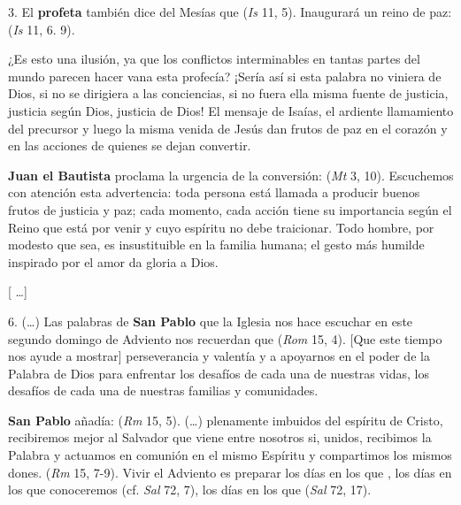 \begin{body}
	3. El \textbf{profeta} también dice del Mesías que  (\emph{Is} 11, 5). Inaugurará un reino de paz:  (\emph{Is} 11, 6. 9). 
	
	¿Es esto una ilusión, ya que los conflictos interminables en tantas partes del mundo parecen hacer vana esta profecía? ¡Sería así si esta palabra no viniera de Dios, si no se dirigiera a las conciencias, si no fuera ella misma fuente de justicia, justicia según Dios, justicia de Dios! El mensaje de Isaías, el ardiente llamamiento del precursor y luego la misma venida de Jesús dan frutos de paz en el corazón y en las acciones de quienes se dejan convertir. 
	
	\textbf{Juan el Bautista} proclama la urgencia de la conversión:  (\emph{Mt} 3, 10). Escuchemos con atención esta advertencia: toda persona está llamada a producir buenos frutos de justicia y paz; cada momento, cada acción tiene su importancia según el Reino que está por venir y cuyo espíritu no debe traicionar. Todo hombre, por modesto que sea, es insustituible en la familia humana; el gesto más humilde inspirado por el amor da gloria a Dios.
	
	{[} \ldots{}{]}
	
	6. (\ldots{}) Las palabras de \textbf{San Pablo} que la Iglesia nos hace escuchar en este segundo domingo de Adviento nos recuerdan que  (\emph{Rom} 15, 4). {[}Que este tiempo nos ayude a mostrar{]} perseverancia y valentía y a apoyarnos en el poder de la Palabra de Dios para enfrentar los desafíos de cada una de nuestras vidas, los desafíos de cada una de nuestras familias y comunidades.
	
	\textbf{San Pablo} añadía:  (\emph{Rm} 15, 5). (\ldots{}) plenamente imbuidos del espíritu de Cristo, recibiremos mejor al Salvador que viene entre nosotros si, unidos, recibimos la Palabra y actuamos en comunión en el mismo Espíritu y compartimos los mismos dones.  (\emph{Rm} 15, 7-9). Vivir el Adviento es preparar los días en los que , los días en los que conoceremos  (cf. \emph{Sal} 72, 7), los días en los que  (\emph{Sal} 72, 17).
	

\end{body}
